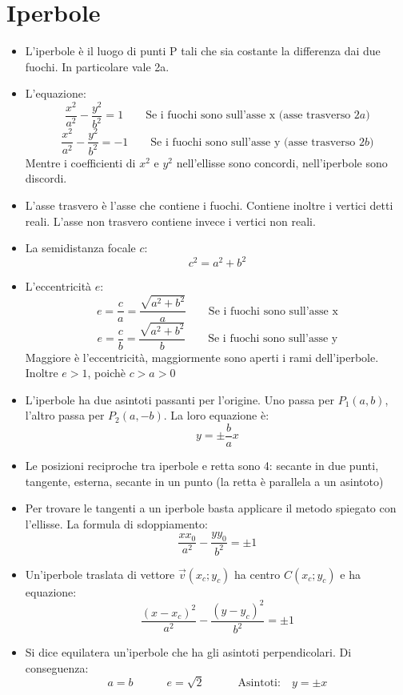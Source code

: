 \documentclass[]{article}
\begin{document}
\section{Iperbole}
\begin{itemize}
	\item L'iperbole è il luogo di punti P tali che sia costante la differenza dai due fuochi. In particolare vale 2a.
	\item L'equazione:
		$$\frac{x^2}{a^2}-\frac{y^2}{b^2}=1 \hspace{2em} \text{Se i fuochi sono sull'asse x (asse trasverso $2a$)}$$
		$$\frac{x^2}{a^2}-\frac{y^2}{b^2}=-1 \hspace{2em} \text{Se i fuochi sono sull'asse y (asse trasverso $2b$)}$$
		Mentre i coefficienti di $x^2$ e $y^2$ nell'ellisse sono concordi, nell'iperbole sono discordi.
	\item L'asse trasvero è l'asse che contiene i fuochi. Contiene inoltre i vertici detti reali. L'asse non trasvero contiene invece i vertici non reali.
	\item La semidistanza focale $c$:
		$$c^2=a^2+b^2$$
	\item L'eccentricità $e$:
		$$e=\frac{c}{a}=\frac{\sqrt{a^2+b^2}}{a} \hspace{2em} \text{Se i fuochi sono sull'asse x}$$
		$$e=\frac{c}{b}=\frac{\sqrt{a^2+b^2}}{b} \hspace{2em} \text{Se i fuochi sono sull'asse y}$$
		Maggiore è l'eccentricità, maggiormente sono aperti i rami dell'iperbole. Inoltre $e>1$, poichè $c>a>0$
	\item L'iperbole ha due asintoti passanti per l'origine. Uno passa per $P_1(a,b)$, l'altro passa per $P_2(a,-b)$. La loro equazione è:
		$$y=\pm\frac{b}{a}x$$
	\item Le posizioni reciproche tra iperbole e retta sono 4: secante in due punti, tangente, esterna, secante in un punto (la retta è parallela a un asintoto)
	\item Per trovare le tangenti a un iperbole basta applicare il metodo spiegato con l'ellisse. La formula di sdoppiamento:
		$$\frac{xx_0}{a^2}-\frac{yy_0}{b^2}=\pm 1$$
	\item Un'iperbole traslata di vettore $\vec{v}(x_c;y_c)$ ha centro $C(x_c;y_c)$ e ha equazione:
		$$\frac{(x-x_c)^2}{a^2}-\frac{(y-y_c)^2}{b^2}=\pm 1$$
	\item Si dice equilatera un'iperbole che ha gli asintoti perpendicolari. Di conseguenza:
		$$a=b \hspace{3em} e=\sqrt{2} \hspace{3em} \text{Asintoti:} \hspace{1em} y=\pm x$$

\end{itemize}
\end{document}
